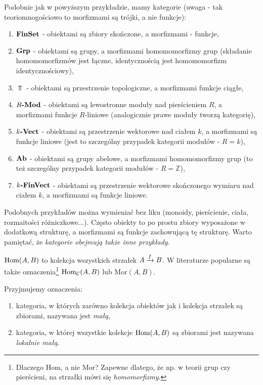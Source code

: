 \begin{exmp}
  \label{exmp:standard}
  Podobnie jak w powyższym przykładzie, mamy kategorie (uwaga - tak teoriomnogościowo to morfizmami są trójki, a nie funkcje):
  \begin{enumerate}
    \item $\FinSet$ - obiektami są zbiory skończone, a morfizmami - funkcje,
    \item $\Grp$ - obiektami są grupy, a morfizmami homomomorfizmy grup (składanie homomomorfizmów jest łączne, identycznością jest homomomorfizm identycznościowy),
    \item $\Top$ - obiektami są przestrzenie topologiczne, a morfizmami funkcje ciągłe,
    \item $\Mod R$ - obiektami są lewostronne moduły nad pierścieniem $R$, a morfizmami funkcje $R$-liniowe (analogicznie prawe moduły tworzą kategorię),
    \item $\Vect k$ - obiektami są przestrzenie wektorowe nad ciałem $k$, a morfizmami są funkcje liniowe (jest to szczególny przypadek kategorii modułów - $R=k$),
    \item $\Ab$ - obiektami są grupy abelowe, a morfizmami homomomorfizmy grup (to też szczególny przypadek kategorii modułów - $R=\mathbb Z$),
    \item $\FinVect k$ - obiektami są przestrzenie wektorowe skończonego wymiaru nad ciałem $k$, a morfizmami są funkcje liniowe.
  \end{enumerate}
  Podobnych przykładów można wymieniać bez liku (monoidy, pierścienie, ciała, rozmaitości różniczkowe...). Często obiekty to po prostu zbiory wyposażone w dodatkową strukturę, a morfizmami są funkcje zachowującą tę strukturę. Warto pamiętać, że \emph{kategorie obejmują także inne przykłady}.
\end{exmp}

\begin{nott}
  $\Mor AB$ to kolekcja wszystkich strzałek $\morpharr fAB$. W literaturze popularne są także oznaczenia\footnote{Dlaczego Hom, a nie Mor? Zapewne dlatego, że np. w teorii grup czy pierścieni, na strzałki mówi się \emph{homomorfizmy}.} $\bareMor_\C(A, B)$ lub $\mathrm{Mor}(A, B)$.
\end{nott}

\begin{defn}
Przyjmujemy oznaczenia:
\begin{enumerate}
  \item kategoria, w których zarówno kolekcja obiektów jak i kolekcja strzałek są zbiorami, nazywana jest \emph{małą},
  \item kategoria, w której wszystkie kolekcje $\Mor AB$ są zbiorami jest nazywana \emph{lokalnie małą}.
\end{enumerate}
\end{defn}

